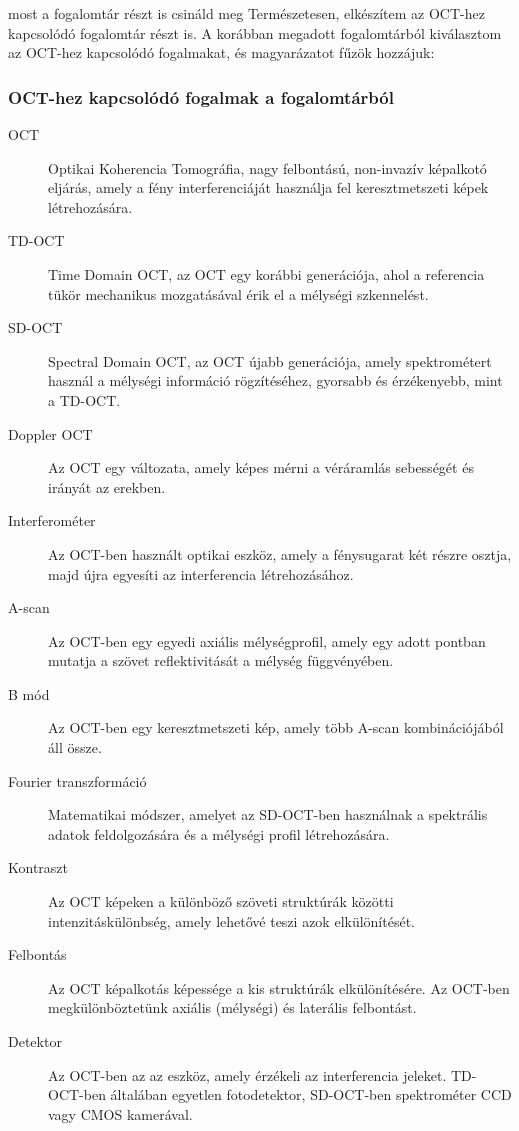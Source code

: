 \documentclass[a4paper,12pt]{article}
\begin{document}
most a fogalomtár részt is csináld meg
Természetesen, elkészítem az OCT-hez kapcsolódó fogalomtár részt is. A korábban megadott fogalomtárból kiválasztom az OCT-hez kapcsolódó fogalmakat, és magyarázatot fűzök hozzájuk:

\subsubsection{OCT-hez kapcsolódó fogalmak a fogalomtárból}

\begin{description} \item[OCT] Optikai Koherencia Tomográfia, nagy felbontású, non-invazív képalkotó eljárás, amely a fény interferenciáját használja fel keresztmetszeti képek létrehozására.

\item[TD-OCT] Time Domain OCT, az OCT egy korábbi generációja, ahol a referencia tükör mechanikus mozgatásával érik el a mélységi szkennelést. \item[SD-OCT] Spectral Domain OCT, az OCT újabb generációja, amely spektrométert használ a mélységi információ rögzítéséhez, gyorsabb és érzékenyebb, mint a TD-OCT. \item[Doppler OCT] Az OCT egy változata, amely képes mérni a véráramlás sebességét és irányát az erekben. \item[Interferométer] Az OCT-ben használt optikai eszköz, amely a fénysugarat két részre osztja, majd újra egyesíti az interferencia létrehozásához. \item[A-scan] Az OCT-ben egy egyedi axiális mélységprofil, amely egy adott pontban mutatja a szövet reflektivitását a mélység függvényében. \item[B mód] Az OCT-ben egy keresztmetszeti kép, amely több A-scan kombinációjából áll össze. \item[Fourier transzformáció] Matematikai módszer, amelyet az SD-OCT-ben használnak a spektrális adatok feldolgozására és a mélységi profil létrehozására. \item[Kontraszt] Az OCT képeken a különböző szöveti struktúrák közötti intenzitáskülönbség, amely lehetővé teszi azok elkülönítését. \item[Felbontás] Az OCT képalkotás képessége a kis struktúrák elkülönítésére. Az OCT-ben megkülönböztetünk axiális (mélységi) és laterális felbontást. \item[Detektor] Az OCT-ben az az eszköz, amely érzékeli az interferencia jeleket. TD-OCT-ben általában egyetlen fotodetektor, SD-OCT-ben spektrométer CCD vagy CMOS kamerával.
\end{description}
\end{document}
